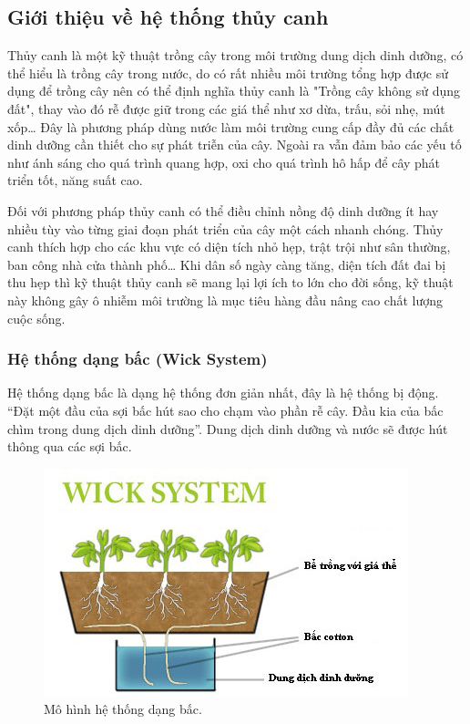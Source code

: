 \documentclass[a4paper,12pt,oneside]{article}
\begin{document}
\subsection{Giới thiệu về hệ thống thủy canh}

\noindent Thủy canh là một kỹ thuật trồng cây trong môi trường dung dịch dinh dưỡng, có thể hiểu là trồng cây trong nước, do có rất nhiều môi trường tổng hợp được sử dụng để trồng cây nên có thể định nghĩa thủy canh là "Trồng cây không sử dụng đất"\cite{thuycanh}, thay vào đó rễ được giữ trong các giá thể như xơ dừa, trấu, sỏi nhẹ, mút xốp… Đây là phương pháp dùng nước làm môi trường cung cấp đầy đủ các chất dinh dưỡng cần thiết cho sự phát triễn của cây. Ngoài ra vẫn đảm bảo các yếu tố như ánh sáng cho quá trình quang hợp, oxi cho quá trình hô hấp để cây phát triển tốt, năng suất cao. 

\noindent Đối với phương pháp thủy canh có thể điều chỉnh nồng độ dinh dưỡng ít hay nhiều tùy vào từng giai đoạn phát triển của cây một cách nhanh chóng. Thủy canh thích hợp cho các khu vực có diện tích nhỏ hẹp, trật trội như sân thường, ban công nhà cửa thành phố… Khi dân số ngày càng tăng, diện tích đất đai bị thu hẹp thì kỹ thuật thủy canh sẽ mang lại lợi ích to lớn cho đời sống, kỹ thuật này không gây ô nhiễm môi trường là mục tiêu hàng đầu nâng cao chất lượng cuộc sống.

\subsubsection{Hệ thống dạng bấc (Wick System)}
\noindent Hệ thống dạng bấc là dạng hệ thống đơn giản nhất, đây là hệ thống bị động. “Đặt một đầu của sợi bấc hút sao cho chạm vào phần rễ cây. Đầu kia của bấc chìm trong dung dịch dinh dưỡng”\cite{thuycanh}. Dung dịch dinh dưỡng và nước sẽ được hút thông qua các sợi bấc.

\begin{figure}[H]
	\centering
	\includegraphics[scale=.8]{hinh/Wick_system.jpg}
	\caption{Mô hình hệ thống dạng bấc\cite{thuycanh}.}
	\label{fig:Wick_system}
\end{figure}
\end{document}
